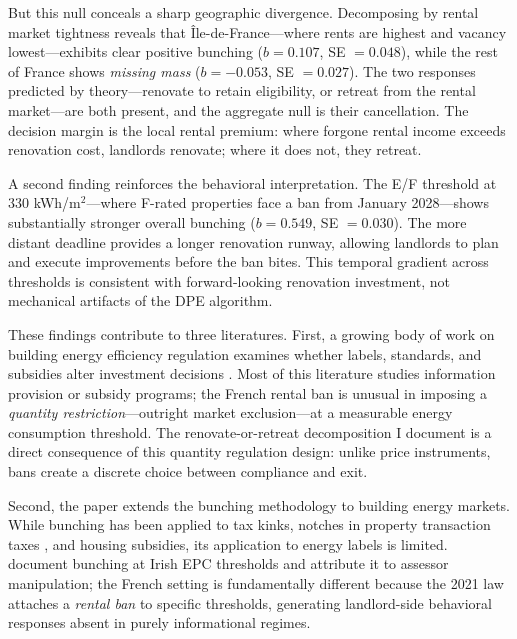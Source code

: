 \documentclass[12pt]{article}
\begin{document}
But this null conceals a sharp geographic divergence. Decomposing by rental market tightness reveals that \^{I}le-de-France---where rents are highest and vacancy lowest---exhibits clear positive bunching ($b = 0.107$, SE $= 0.048$), while the rest of France shows \textit{missing mass} ($b = -0.053$, SE $= 0.027$). The two responses predicted by theory---renovate to retain eligibility, or retreat from the rental market---are both present, and the aggregate null is their cancellation. The decision margin is the local rental premium: where forgone rental income exceeds renovation cost, landlords renovate; where it does not, they retreat.

A second finding reinforces the behavioral interpretation. The E/F threshold at 330 kWh/m$^2$---where F-rated properties face a ban from January 2028---shows substantially stronger overall bunching ($b = 0.549$, SE $= 0.030$). The more distant deadline provides a longer renovation runway, allowing landlords to plan and execute improvements before the ban bites. This temporal gradient across thresholds is consistent with forward-looking renovation investment, not mechanical artifacts of the DPE algorithm.

These findings contribute to three literatures. First, a growing body of work on building energy efficiency regulation examines whether labels, standards, and subsidies alter investment decisions \citep{allcott2014, gerarden2017, fowlie2018, levinson2016}. Most of this literature studies information provision or subsidy programs; the French rental ban is unusual in imposing a \textit{quantity restriction}---outright market exclusion---at a measurable energy consumption threshold. The renovate-or-retreat decomposition I document is a direct consequence of this quantity regulation design: unlike price instruments, bans create a discrete choice between compliance and exit.

Second, the paper extends the bunching methodology \citep{saez2010, kleven2013, kleven2016, chetty2011} to building energy markets. While bunching has been applied to tax kinks, notches in property transaction taxes \citep{best2015}, and housing subsidies, its application to energy labels is limited. \citet{collins2018} document bunching at Irish EPC thresholds and attribute it to assessor manipulation; the French setting is fundamentally different because the 2021 law attaches a \textit{rental ban} to specific thresholds, generating landlord-side behavioral responses absent in purely informational regimes.
\end{document}
